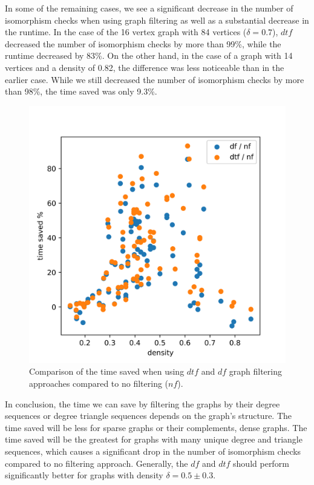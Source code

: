 In some of the remaining cases, we see a significant decrease in the number of isomorphism checks when using graph filtering as well as a substantial decrease in the runtime. In the case of the 16 vertex graph with 84 vertices ($\delta = 0.7$), $dtf$ decreased the number of isomorphism checks by more than 99\%, while the runtime decreased by 83\%. On the other hand, in the case of a graph with 14 vertices and a density of 0.82, the difference was less noticeable than in the earlier case. While we still decreased the number of isomorphism checks by more than 98\%, the time saved was only 9.3\%.

\begin{figure}[H]
\begin{center}
\includegraphics[scale=0.8,keepaspectratio]{images/density_filter_type_comparison.png}
\end{center}
\caption{Comparison of the time saved when using $dtf$ and $df$ graph filtering approaches compared to no filtering ($nf$).}
\label{fig:filter_type_comparison}
\end{figure}

In conclusion, the time we can save by filtering the graphs by their degree sequences or degree triangle sequences depends on the graph's structure. The time saved will be less for sparse graphs or their complements, dense graphs. The time saved will be the greatest for graphs with many unique degree and triangle sequences, which causes a significant drop in the number of isomorphism checks compared to no filtering approach. Generally, the $df$ and $dtf$ should perform significantly better for graphs with density $\delta = 0.5 \pm 0.3$.

